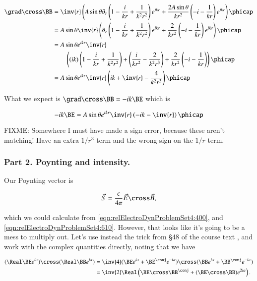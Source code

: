 \begin{align*}
\grad \cross \BB 
&=
\inv{r } \left(
 A\sin\theta 
\partial_r \left( 1 - \frac{i}{k r} + \frac{1}{k^2 r^2} \right) e^{i k r} 
+\frac{2 A \sin\theta}{k r^2} 
\left( -i - \frac{1}{k r} \right) e^{i k r} 
\right) \phicap \\
&=
A \sin\theta 
\inv{r } \left(
\partial_r \left( 1 - \frac{i}{k r} + \frac{1}{k^2 r^2} \right) e^{i k r} 
+\frac{2 }{k r^2} 
\left( -i - \frac{1}{k r} \right) e^{i k r} 
\right) \phicap \\
&=
A \sin\theta e^{i k r}
\inv{r } \\
&\qquad \left(
(ik)\left( 1 - \frac{i}{k r} + \frac{1}{k^2 r^2} \right) 
+\left( \frac{i}{k r^2} - \frac{2}{k^2 r^3} \right) 
+\frac{2 }{k r^2} 
\left( -i - \frac{1}{k r} \right) 
\right) \phicap \\
&=
A \sin\theta e^{i k r}
\inv{r } \left(
i k + \inv{r} - \frac{ 4 }{k^2 r^3}
\right) \phicap \\
\end{align*}

What we expect is $\grad \cross \BB = - i k \BE$ which is

\begin{equation}\label{eqn:relElectroDynProblemSet4:640}
- i k \BE =
A \sin\theta e^{i k r}
\inv{r } \left(
- i k - \inv{r}
\right) \phicap 
\end{equation}

FIXME: Somewhere I must have made a sign error, because these aren't matching!  Have an extra $1/r^3$ term and the wrong sign on the $1/r$ term.

\subsubsection{Part 2.  Poynting and intensity.}

Our Poynting vector is

\begin{equation}\label{eqn:relElectroDynProblemSet4:650}
\vec{S} = \frac{c}{4 \pi} \vec{E} \cross \vec{B},
\end{equation}

which we could calculate from \ref{eqn:relElectroDynProblemSet4:400}, and \ref{eqn:relElectroDynProblemSet4:610}.  However, that looks like it's going to be a mess to multiply out.  Let's use instead the trick from \S 48 of the course text \citep{landau1980classical}, and work with the complex quantities directly, noting that we have

\begin{align*}
(\Real \BE e^{i \alpha}) \cross (\Real \BB e^{i \alpha}) 
&= \inv{4} 
( \BE e^{i \alpha} + \BE^\conj e^{-i \alpha}) \cross ( \BB e^{i \alpha} + \BB^\conj e^{-i \alpha}) \\
&= \inv{2} \Real \left( \BE \cross \BB^\conj + (\BE \cross \BB) e^{2 i \alpha} \right).
\end{align*}

